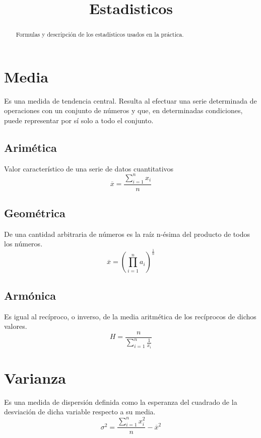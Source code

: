 
\title{Estadisticos}

\maketitle
\begin{abstract}
    \centering
    Formulas y descripción de los estadísticos usados en la práctica.
\end{abstract}

\section{Media}
Es una medida de tendencia central. Resulta al efectuar una serie determinada de operaciones con un conjunto de números y que, en determinadas condiciones, puede representar por sí solo a todo el conjunto.
\subsection{Arimética}
Valor característico de una serie de datos cuantitativos
\begin{equation}
    \overline{x} = \dfrac{\sum\limits_{i=1}^n{x_i}}{n}
\end{equation}
\subsection{Geométrica}
De una cantidad arbitraria de números es la raíz n-ésima del producto de todos los números.
\begin{equation}
    \overline{x} = (\prod\limits_{i=1}^n{a_i})^{\frac{1}{n}}
\end{equation}
\subsection{Armónica}
Es igual al recíproco, o inverso, de la media aritmética de los recíprocos de dichos valores.
\begin{equation}
    H = \dfrac{n}{\sum\limits_{i=1}^n{\frac{1}{x_i}}}
\end{equation}
\section{Varianza}
Es una medida de dispersión definida como la esperanza del cuadrado de la desviación de dicha variable respecto a su media.
\begin{equation}
    \sigma^2 = \dfrac{\sum\limits_{i=1}^n{x^2_i}}{n}-\overline{x}^2
\end{equation}
